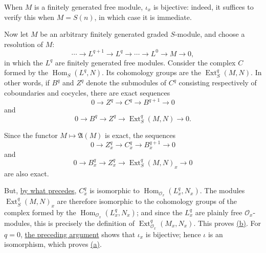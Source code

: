 \label{fac:III:5:no:73:proof:free-case}
When $M$ is a finitely generated free module, $\iota_x$ is bijective:
indeed, it suffices to verify this when $M=S(n)$, in which case it is
immediate.

\label{fac:III:5:no:73:proof:resolution-case}
Now let $M$ be an arbitrary finitely generated graded $S$-module, and
choose a resolution of $M$:
\label{fac:III:5:no:73:formula:resolution}
\[
\cdots\longrightarrow L^{q+1}\longrightarrow L^q
\longrightarrow\cdots\longrightarrow L^0
\longrightarrow M\longrightarrow0,
\]
\label{fac:III:5:no:73:def:complex-C}
in which the $L^q$ are finitely generated free modules. Consider the
complex $C$ formed by the $\operatorname{Hom}_S(L^q,N)$. Its
cohomology groups are the $\operatorname{Ext}_S^q(M,N)$.
\label{fac:III:5:no:73:def:boundaries-cocycles}
In other words, if $B^q$ and $Z^q$
denote the submodules of $C^q$ consisting respectively of coboundaries
and cocycles, there are exact sequences
\label{fac:III:5:no:73:formula:cycles-boundaries}
\[
0\longrightarrow Z^q\longrightarrow C^q
\longrightarrow B^{q+1}\longrightarrow0
\]
and
\[
0\longrightarrow B^q\longrightarrow Z^q
\longrightarrow\operatorname{Ext}_S^q(M,N)\longrightarrow0.
\]

Since the functor $M\mapsto\mathfrak A(M)$ is exact, the sequences
\label{fac:III:5:no:73:formula:localized-cycles-boundaries}
\[
0\longrightarrow Z_x^q\longrightarrow C_x^q
\longrightarrow B_x^{q+1}\longrightarrow0
\]
and
\[
0\longrightarrow B_x^q\longrightarrow Z_x^q
\longrightarrow\operatorname{Ext}_S^q(M,N)_x\longrightarrow0
\]
are also exact.

But, \hyperref[fac:III:5:no:73:proof:free-case]{by what precedes}, $C_x^q$
is isomorphic to
$\operatorname{Hom}_{\mathcal O_x}(L_x^q,N_x)$. The modules
$\operatorname{Ext}_S^q(M,N)_x$ are therefore isomorphic to the
cohomology groups of the complex formed by the
$\operatorname{Hom}_{\mathcal O_x}(L_x^q,N_x)$; and since the $L_x^q$
are plainly free $\mathcal O_x$-modules, this is precisely the
definition of $\operatorname{Ext}_{\mathcal O_x}^q(M_x,N_x)$. This proves
\hyperref[fac:III:5:no:73:prop:1:b]{(b)}. For $q=0$,
\hyperref[fac:III:5:no:73:proof:resolution-case]{the preceding argument}
shows that $\iota_x$ is bijective; hence $\iota$ is an isomorphism, which
proves \hyperref[fac:III:5:no:73:prop:1:a]{(a)}.
